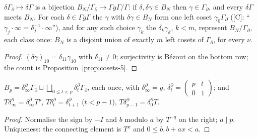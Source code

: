 \begin{proposition}\label{prop:bdrycosets}
  \leanok
  $\delta\Gamma_\partial\mapsto\delta\Gamma$ is a bijection $B_N/\Gamma_\partial\to\Gamma g\Gamma/\Gamma$: if $\delta,\delta\gamma\in B_N$
  then $\gamma\in\Gamma_\partial$, and every $\delta\Gamma$ meets $B_N$. For each $\delta\in\Gamma g\Gamma$ the $\gamma$ with
  $\delta\gamma\in B_N$ form one left coset $\gamma_0\Gamma_\partial$ ([C]: ``$\gamma_j\cdot\infty=\delta_j^{-1}\cdot\infty$''), and for
  any such choice $\gamma_k$ the $\delta_k\gamma_k$, $k<m$, represent $B_N/\Gamma_\partial$, each class once: $B_N$ is a disjoint
  union of exactly $m$ left cosets of $\Gamma_\partial$, for every $\nu$.
\end{proposition}
\begin{proof}
  \leanok
  $(\delta\gamma)_{10}=\delta_{11}\gamma_{10}$ with $\delta_{11}\ne0$; surjectivity is Bézout on the bottom row; the count is
  Proposition~\ref{prop:cosets-5}.
\end{proof}

\begin{proposition}[$\nu=1$: the left cosets and the $T$-identities]\label{prop:bdrycosets-1}
  \leanok
  $B_p=\delta^\partial_\infty\Gamma_\partial\sqcup\bigsqcup_{0\le t<p}\delta^\partial_t\Gamma_\partial$, each once, with
  $\delta^\partial_\infty=g$, $\delta^\partial_t=\left(\begin{smallmatrix}p&t\\0&1\end{smallmatrix}\right)$; and
  $T\delta^\partial_\infty=\delta^\partial_\infty T^p$, $T\delta^\partial_t=\delta^\partial_{t+1}$ ($t<p-1$),
  $T\delta^\partial_{p-1}=\delta^\partial_0T$.
\end{proposition}
\begin{proof}
  \leanok
  Normalise the sign by $-I$ and $b$ modulo $a$ by $T^{-q}$ on the right; $a\mid p$. Uniqueness: the connecting element is
  $T^x$ and $0\le b,b+ax<a$.
\end{proof}

